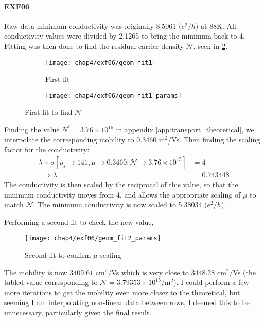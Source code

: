 \documentclass[../Matt_Gebert_Honours_Thesis.tex]{subfiles}
\begin{document}
	\paragraph{EXF06}
	Raw data minimum conductivity was originally 8.5061 ($e^2/h$) at 88K. All conductivity values were divided by 2.1265 to bring the minimum back to 4. Fitting was then done to find the residual carrier density $\mathcal{N}$, seen in \cref{fig:geomfit1}.
	\begin{figure}[H]
		\begin{subfigure}[b]{0.6\textwidth}
			\centering
			\texttt{[image: chap4/exf06/geom\_fit1]}
			\caption{First fit}
		\end{subfigure}
		\begin{subfigure}[b]{0.4\textwidth}
			\centering
			\texttt{[image: chap4/exf06/geom\_fit1\_params]}
			\label{fig:geomfit1params}		
		\end{subfigure}
		\caption[Geometric factor fitting to find $\mathcal{N}$]{First fit to find $\mathcal{N}$}\label{fig:geomfit1}
	\end{figure}
	Finding the value $N^{*} = 3.76\times10^{15}$ in appendix \ref{app:transport_theoretical}, we interpolate the corresponding mobility to 0.3460 m$^2$/Vs. Then finding the scaling factor for the conductivity:
	\begin{align}
		\lambda \times \sigma\left[\rho_{s}\to 141, \mu\to 0.3460, \mathcal{N}\to 3.76\times 10^{15}\right] &= 4\\
		\implies \lambda &= 0.743448
	\end{align}
	The conductivity is then scaled by the reciprocal of this value, so that the minimum conductivity moves from 4, and allows the appropriate scaling of $\mu$ to match $\mathcal{N}$. The minimum conductivity is now scaled to 5.38034 ($e^2/h$).
	
	Performing a second fit to check the new value,
	\begin{figure}[H]
		\centering
		\texttt{[image: chap4/exf06/geom\_fit2\_params]}
		\caption[Geometric factor fitting to find $\mu$]{Second fit to confirm $\mu$ scaling}\label{fig:geomfit2}
	\end{figure}
	The mobility is now $3409.61$ cm$^2$/Vs which is very close to 3448.28 cm$^2$/Vs (the tabled value corresponding to $\mathcal{N}=3.79353\times10^{15}$/m$^2$). I could perform a few more iterations to get the mobility even more closer to the theoretical, but seeming I am interpolating non-linear data  between rows, I deemed this to be unnecessary, particularly given the final result.
\end{document}
